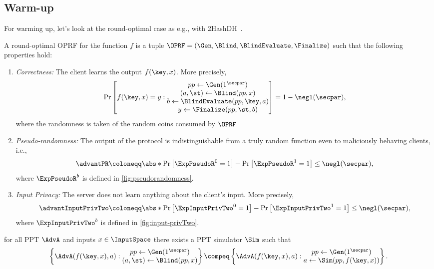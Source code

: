 
\subsection{Warm-up}
For warming up, let's look at the round-optimal case as e.g., with 2HashDH~\cite{EC:JarKraXu18}.

\begin{definition}
    \label{def:simple-oprf}
    A round-optimal OPRF for the function $f$ is a tuple $\OPRF=(\Gen,\Blind,\BlindEvaluate,\Finalize)$ such that the following properties hold:
    \begin{enumerate}
        \item \emph{Correctness:} The client learns the output $f(\key,x)$. More precisely,
            \[\Pr\left[f(\key,x)=y : 
            \begin{matrix}
                pp\gets\Gen(1^\secpar)\\
                (a,\st)\gets\Blind(pp,x)\\
                b\gets\BlindEvaluate(pp,\key,a)\\
                y\gets\Finalize(pp,\st,b)
            \end{matrix}
            \right]=1-\negl(\secpar),\]
            where the randomness is taken of the random coins consumed by $\OPRF$
        \item \emph{Pseudo-randomness:}
            The output of the protocol is indistinguishable from a truly random function even to maliciously behaving clients, i.e., 
            \[
               \advantPR\coloneqq \abs*{\Pr\left[\ExpPseudoR^{0}=1\right]-\Pr\left[\ExpPseudoR^{1}=1\right]} 
              \leq\negl(\secpar)
            ,\]
            where $\ExpPseudoR^b$ is defined in \cref{fig:pseudorandomness}.
            \item \emph{Input Privacy:} The server does not learn anything about the client's input.
            More precisely, 
            \[
               \advantInputPrivTwo\coloneqq \abs*{\Pr\left[\ExpInputPrivTwo^{0}=1\right]-\Pr\left[\ExpInputPrivTwo^{1}=1\right]} 
              \leq\negl(\secpar)
            ,\]
            where $\ExpInputPrivTwo^b$ is defined in \cref{fig:input-privTwo}.
\end{enumerate}
\end{definition}
    for all PPT $\AdvA$ and inputs $x\in\InputSpace$ there exists a PPT simulator $\Sim$ such that
    \[
    \left\{
        \AdvA(f(\key,x),a):
    \begin{matrix}
        pp\gets\Gen(1^\secpar)\\
        (a,\st)\gets\Blind(pp,x)\\
    \end{matrix}
    \right\}
    \compeq
    \left\{
        \AdvA(f(\key,x),a):
    \begin{matrix}
        pp\gets\Gen(1^\secpar)\\
        a\gets\Sim(pp,f(\key,x))\\
    \end{matrix}
    \right\}.\]


